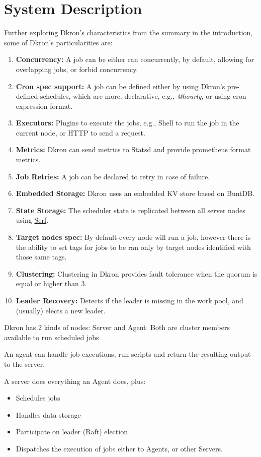 \documentclass[runningheads]{llncs}
\begin{document}
\section{System Description}
\label{system_description}

Further exploring Dkron's characteristics from the summary in the introduction, some of Dkron's particularities are:
\begin{enumerate}
    \item \textbf{Concurrency:} A job can be either ran concurrently, by default,
    allowing for overlapping jobs, or forbid concurrency.
    \item \textbf{Cron spec support:} A job can be defined either by using Dkron's
    pre-defined schedules, which are more.
    declarative, e.g., \textit{@hourly}, or using cron expression format.
    \item \textbf{Executors:} Plugins to execute the jobs, e.g., Shell to run the job in
    the current node, or HTTP to send a request.
    \item \textbf{Metrics:} Dkron can send metrics to Statsd and provide prometheus format metrics.
    \item \textbf{Job Retries:} A job can be declared to retry in case of failure.
    \item \textbf{Embedded Storage:} Dkron uses an embedded KV store based on BuntDB.
    \item \textbf{State Storage:} The scheduler state is replicated between all
    server nodes using \href{https://www.serf.io/}{Serf}.
    \item \textbf{Target nodes spec:} By default every node will run a job, however there is
    the ability to set tags for jobs to be ran only by target nodes identified with those
    same tags.
    \item \textbf{Clustering:} Clustering in Dkron provides fault tolerance when the
    quorum is equal or higher than 3.
    \item \textbf{Leader Recovery:} Detects if the leader is missing in the work pool,
    and (usually) elects a new leader.
\end{enumerate}


Dkron has 2 kinds of nodes: Server and Agent.
Both are cluster members available to run scheduled jobs

An agent can handle job executions, run scripts and return the resulting output to the server.

A server does everything an Agent does, plus:
\begin{itemize}
    \item Schedules jobs
    \item Handles data storage
    \item Participate on leader (Raft) election
    \item Dispatches the execution of jobs either to Agents, or other Servers.
\end{itemize}
\end{document}

